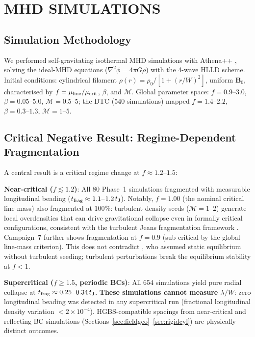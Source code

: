 \documentclass[twoside,twocolumn]{mnras}
\begin{document}
\section{MHD SIMULATIONS}

\subsection{Simulation Methodology}

We performed self-gravitating isothermal MHD simulations with Athena++ \citep{Stone2020},
solving the ideal-MHD equations ($\nabla^2\phi = 4\pi G\rho$) with the 4-wave HLLD
scheme. Initial conditions: cylindrical filament $\rho(r) = \rho_0/[1+(r/W)^2]$,
uniform $\mathbf{B}_0$, characterised by $f = \mu_{\rm line}/\mu_{\rm crit}$, $\beta$,
and $\mathcal{M}$. Global parameter space: $f=0.9$--$3.0$, $\beta=0.05$--$5.0$,
$\mathcal{M}=0.5$--$5$; the DTC (540 simulations) mapped $f=1.4$--$2.2$,
$\beta=0.3$--$1.3$, $\mathcal{M}=1$--$5$.

\subsection{Critical Negative Result: Regime-Dependent Fragmentation}
\label{sec:critnat}

A central result is a critical regime change at $f \approx 1.2$--$1.5$:

\textbf{Near-critical ($f \lesssim 1.2$)}: All 80 Phase~1 simulations fragmented with
measurable longitudinal beading ($t_{\rm frag} \approx 1.1$--$1.2\,t_{\rm J}$). Notably,
$f = 1.00$ (the nominal critical line-mass) also fragmented at 100\%: turbulent
density seeds ($\mathcal{M} = 1$--$2$) generate local overdensities that can drive
gravitational collapse even in formally critical configurations, consistent with the
turbulent Jeans fragmentation framework \citep[e.g.][]{Padoan2011}. Campaign~7 further
shows fragmentation at $f = 0.9$ (sub-critical by the global line-mass criterion).
This does not contradict \citet{Ostriker1964}, who assumed static equilibrium without
turbulent seeding; turbulent perturbations break the equilibrium stability at $f < 1$.

\textbf{Supercritical ($f \geq 1.5$, periodic BCs)}: All 654 simulations yield pure radial
collapse at $t_{\rm frag} \approx 0.25$--$0.34\,t_{\rm J}$. \textbf{These simulations
cannot measure $\lambda/W$}: zero longitudinal beading was detected in any supercritical
run (fractional longitudinal density variation $< 2\times 10^{-4}$). HGBS-compatible
spacings from near-critical and reflecting-BC simulations (Sections~\ref{sec:fieldgeo}--\ref{sec:rigidcyl}) are physically distinct outcomes.
\end{document}
